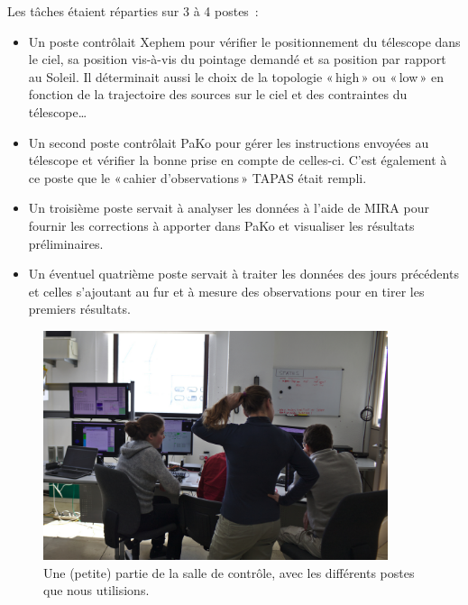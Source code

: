\documentclass[a4paper,10pt,french]{article}
\begin{document}
Les tâches étaient réparties sur 3 à 4 postes :
\begin{itemize}
    \item Un poste contrôlait Xephem pour vérifier le positionnement du
          télescope dans le ciel, sa position vis-à-vis du
          pointage demandé et sa position par rapport au Soleil. Il déterminait aussi le
          choix de la topologie « high » ou « low » en fonction de la
          trajectoire des sources sur le ciel et des contraintes du télescope…
    \item Un second poste contrôlait PaKo pour gérer les instructions envoyées
          au télescope et vérifier la bonne prise en compte de celles-ci. C’est
          également à ce poste que le « cahier d’observations » TAPAS était
          rempli.
    \item Un troisième poste servait à analyser les données à l’aide de MIRA
          pour fournir les corrections à apporter dans PaKo et visualiser les
          résultats préliminaires.
    \item Un éventuel quatrième poste servait à traiter les données des jours
          précédents et celles s’ajoutant au fur et à mesure des observations
          pour en tirer les premiers résultats.
\end{itemize}

\begin{figure}[ht]
    \centering
    \includegraphics[width=0.9\textwidth]{control_room.jpg}
    \caption{Une (petite) partie de la salle de contrôle, avec les différents
    postes que nous utilisions.}
\end{figure}
\end{document}
